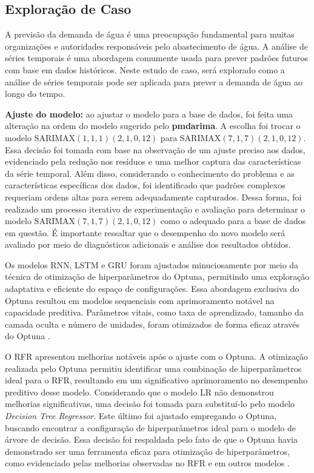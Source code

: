 

\subsection{Explora\c c\~ao de Caso}\label{subsec:estudo-de-caso-base}


A previsão da demanda de água é uma preocupação fundamental para muitas organizações e autoridades responsáveis pelo abastecimento de água. A análise de séries temporais é uma abordagem comumente usada para prever padrões futuros com base em dados históricos. Neste estudo de caso, será explorado como a análise de séries temporais pode ser aplicada para prever a demanda de água ao longo do tempo.

\noindent\textbf{Ajuste do modelo:}
ao ajustar o modelo para a base de dados, foi feita uma alteração na ordem do modelo sugerido pelo \textbf{pmdarima}. A escolha foi trocar o modelo SARIMAX$(1,1,1)(2,1,0,12)$ para SARIMAX$(7,1,7)(2,1,0,12)$. Essa decisão foi tomada com base na observação de um ajuste preciso aos dados, evidenciado pela redução nos resíduos e uma melhor captura das características da série temporal. Além disso, considerando o conhecimento do problema e as características específicas dos dados, foi identificado que padrões complexos requeriam ordens altas para serem adequadamente capturados. Dessa forma, foi realizado um processo iterativo de experimentação e avaliação para determinar o modelo SARIMAX$(7,1,7)(2,1,0,12)$ como o adequado para a base de dados em questão. É importante ressaltar que o desempenho do novo modelo será avaliado por meio de diagnósticos adicionais e análise dos resultados obtidos.

Os modelos RNN, LSTM e GRU foram ajustados minuciosamente por meio da técnica de otimização de hiperparâmetros do Optuna, permitindo uma exploração adaptativa e eficiente do espaço de configurações. Essa abordagem exclusiva do Optuna resultou em modelos sequenciais com aprimoramento notável na capacidade preditiva. Parâmetros vitais, como taxa de aprendizado, tamanho da camada oculta e número de unidades, foram otimizados de forma eficaz através do Optuna \cite{DBLP}.

O RFR apresentou melhorias notáveis após o ajuste com o Optuna. A otimização realizada pelo Optuna permitiu identificar uma combinação de hiperparâmetros ideal para o RFR, resultando em um significativo aprimoramento no desempenho preditivo desse modelo.
Considerando que o modelo LR não demonstrou melhorias significativas, uma decisão foi tomada para substituí-lo pelo modelo \textit{Decision Tree Regressor}. Este último foi ajustado empregando o Optuna, buscando encontrar a configuração de hiperparâmetros ideal para o modelo de árvore de decisão. Essa decisão foi respaldada pelo fato de que o Optuna havia demonstrado ser uma ferramenta eficaz para otimização de hiperparâmetros, como evidenciado pelas melhorias observadas no RFR e em outros modelos \cite{DBLP}.

